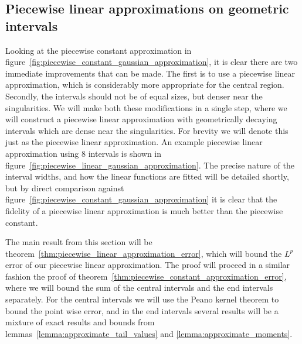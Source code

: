 \documentclass[manuscript,review]{acmart}
\begin{document}
\subsection{Piecewise linear approximations on geometric intervals}
\label{sec:piecewise_linear_approximations_on_geometric_intervals}

Looking at the piecewise constant approximation in figure~\ref{fig:piecewise_constant_gaussian_approximation}, it is clear there are two immediate improvements that can be made. The first is to use a piecewise linear approximation, which is considerably more appropriate for the central region. Secondly, the intervals should not be of equal sizes, but denser near the singularities. We will make both these modifications in a single step, where we will construct a piecewise linear approximation with geometrically decaying intervals which are dense near the singularities. For brevity we will denote this just as the piecewise linear approximation. An example piecewise linear approximation using 8 intervals is shown in figure~\ref{fig:piecewise_linear_gaussian_approximation}. The precise nature of the interval widths, and how the linear functions are fitted will be detailed shortly, but by direct comparison against figure~\ref{fig:piecewise_constant_gaussian_approximation} it is clear that the fidelity of a piecewise linear approximation is much better than the piecewise constant. 

The main result from this section will be theorem~\ref{thm:piecewise_linear_approximation_error}, which will bound the $ L^p $ error of our piecewise linear approximation. The proof will proceed in a similar fashion the proof of theorem~\ref{thm:piecewise_constant_approximation_error}, where we will bound the sum of the central intervals and the end intervals separately. For the central intervals we will use the Peano kernel theorem to bound the point wise error, and in the end intervals several results will be a mixture of exact results and bounds from lemmas~\ref{lemma:approximate_tail_values} and \ref{lemma:approximate_moments}.
\end{document}
